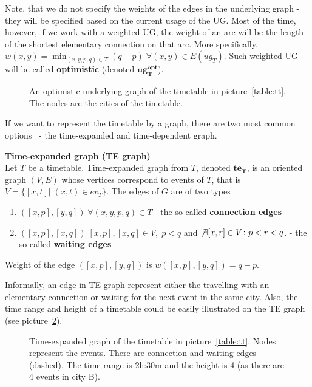     \noindent Note, that we do not specify the weights of the edges in the underlying graph - they will be specified based on the current usage of the UG. Most of the time, however, if we work with a weighted UG, the weight of an arc will be the length of the shortest elementary connection on that arc. More specifically, $w(x, y) = \min_{(x, y, p, q) \in T} (q - p) \; \forall (x, y) \in E(ug_{T})$. Such weighted UG will be called \textbf{optimistic} (denoted $\bm{ug_{T}^{opt}}$).
    
    \begin{figure}[h!]
        \begin{center}
        \end{center}
		\caption{\label{fig:ug} An optimistic underlying graph of the timetable in picture~\ref{table:tt}. The nodes are the \textcolor{city-clr}{cities} of the timetable.}
	\end{figure}
	
	\noindent If we want to represent the timetable by a graph, there are two most common options~\cite{timetablemodelsalgs07} - the time-expanded and time-dependent graph.
	
	\begin{definition}
		\textbf{Time-expanded graph (TE graph)} \\
        Let $T$ be a timetable. Time-expanded graph from $T$, denoted $\bm{te_{T}}$, is an oriented graph $(V, E)$ whose vertices correspond to events of $T$, that is $V = \{[x, t]| \; (x, t) \in ev_{T}\}$. The edges of $G$ are of two types
        \begin{enumerate}
            \item $([x, p], [y, q]) \; \forall (x, y, p, q) \in T$ - the so called \textbf{connection edges}
            \item $([x, p], [x, q]) \; [x, p], [x, q] \in V, \; p < q$ and $\not \exists [x, r] \in V\colon p < r < q$. - the so called \textbf{waiting edges}
		\end{enumerate}
        Weight of the edge $([x, p], [y, q])$ is $w([x, p], [y, q]) = q - p$.
	\end{definition}
	
	\noindent Informally, an edge in TE graph represent either the travelling with an elementary connection or waiting for the next event in the same city. Also, the time range and height of a timetable could be easily illustrated on the TE graph (see picture~\ref{pic:te}). 
	
	\begin{figure}[h!]
	    \begin{center}
	    \end{center}
    	\caption{\label{pic:te} Time-expanded graph of the timetable in picture~\ref{table:tt}. Nodes represent the \textcolor{event-clr}{events}. There are \textcolor{elcon-clr}{connection} and \textcolor{waiting-clr}{waiting} edges (dashed). The time range is 2h:30m and the height is 4 (as there are 4 events in city B).}
	\end{figure}
        
